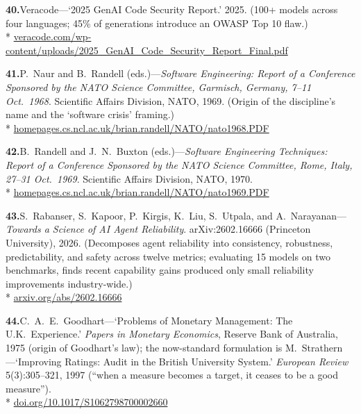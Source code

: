 \documentclass[11pt, a4paper]{article}
\begin{document}
\noindent\textbf{40.}\enspace Veracode---`2025 GenAI Code Security Report.' 2025.
(100+ models across four languages; 45\% of generations introduce an OWASP Top 10
flaw.)\\*
{\fontsize{8}{10}\selectfont\color{midb}
\href{https://www.veracode.com/wp-content/uploads/2025_GenAI_Code_Security_Report_Final.pdf}{veracode.com/wp-content/uploads/2025\_GenAI\_Code\_Security\_Report\_Final.pdf}}


\noindent\textbf{41.}\enspace P.~Naur and B.~Randell (eds.)---\textit{Software Engineering:
Report of a Conference Sponsored by the NATO Science Committee, Garmisch, Germany, 7--11
Oct.\ 1968}. Scientific Affairs Division, NATO, 1969. (Origin of the discipline's name and
the `software crisis' framing.)\\*
{\fontsize{8}{10}\selectfont\color{midb}
\href{http://homepages.cs.ncl.ac.uk/brian.randell/NATO/nato1968.PDF}{homepages.cs.ncl.ac.uk/brian.randell/NATO/nato1968.PDF}}


\noindent\textbf{42.}\enspace B.~Randell and J.~N.~Buxton (eds.)---\textit{Software
Engineering Techniques: Report of a Conference Sponsored by the NATO Science Committee,
Rome, Italy, 27--31 Oct.\ 1969}. Scientific Affairs Division, NATO, 1970.\\*
{\fontsize{8}{10}\selectfont\color{midb}
\href{http://homepages.cs.ncl.ac.uk/brian.randell/NATO/nato1969.PDF}{homepages.cs.ncl.ac.uk/brian.randell/NATO/nato1969.PDF}}


\noindent\textbf{43.}\enspace S.~Rabanser, S.~Kapoor, P.~Kirgis, K.~Liu, S.~Utpala, and
A.~Narayanan---\textit{Towards a Science of AI Agent Reliability}. arXiv:2602.16666
(Princeton University), 2026. (Decomposes agent reliability into consistency, robustness,
predictability, and safety across twelve metrics; evaluating 15 models on two benchmarks,
finds recent capability gains produced only small reliability improvements industry-wide.)\\*
{\fontsize{8}{10}\selectfont\color{midb}
\href{https://arxiv.org/abs/2602.16666}{arxiv.org/abs/2602.16666}}


\noindent\textbf{44.}\enspace C.~A.~E.~Goodhart---`Problems of Monetary Management: The
U.K.\ Experience.' \textit{Papers in Monetary Economics}, Reserve Bank of Australia, 1975
(origin of Goodhart's law); the now-standard formulation is M.~Strathern---`Improving
Ratings: Audit in the British University System.' \textit{European Review} 5(3):305--321,
1997 (``when a measure becomes a target, it ceases to be a good measure'').\\*
{\fontsize{8}{10}\selectfont\color{midb}
\href{https://doi.org/10.1017/S1062798700002660}{doi.org/10.1017/S1062798700002660}}
\end{document}
